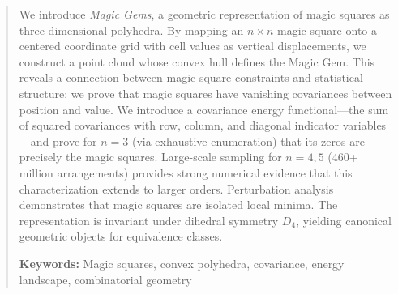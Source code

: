 \begin{abstract}
We introduce \emph{Magic Gems}, a geometric representation of magic squares as three-dimensional polyhedra. 
By mapping an $n \times n$ magic square onto a centered coordinate grid with cell values as vertical displacements, 
we construct a point cloud whose convex hull defines the Magic Gem.
This reveals a connection between magic square constraints and statistical structure: 
we prove that magic squares have vanishing covariances between position and value.
We introduce a covariance energy functional---the sum of squared covariances with row, column, 
and diagonal indicator variables---and prove for $n=3$ (via exhaustive enumeration) 
that its zeros are precisely the magic squares.
Large-scale sampling for $n = 4,5$ (460+ million arrangements) provides strong numerical evidence 
that this characterization extends to larger orders.
Perturbation analysis demonstrates that magic squares are isolated local minima.
The representation is invariant under dihedral symmetry $D_4$, 
yielding canonical geometric objects for equivalence classes.

\medskip
\noindent\textbf{Keywords:} Magic squares, convex polyhedra, covariance, energy landscape, combinatorial geometry
\end{abstract}
